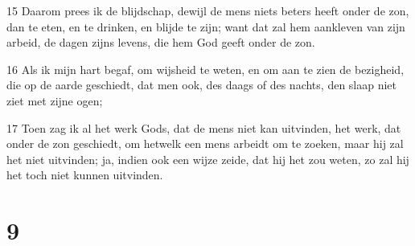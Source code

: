 \par 15 Daarom prees ik de blijdschap, dewijl de mens niets beters heeft onder de zon, dan te eten, en te drinken, en blijde te zijn; want dat zal hem aankleven van zijn arbeid, de dagen zijns levens, die hem God geeft onder de zon.
\par 16 Als ik mijn hart begaf, om wijsheid te weten, en om aan te zien de bezigheid, die op de aarde geschiedt, dat men ook, des daags of des nachts, den slaap niet ziet met zijne ogen;
\par 17 Toen zag ik al het werk Gods, dat de mens niet kan uitvinden, het werk, dat onder de zon geschiedt, om hetwelk een mens arbeidt om te zoeken, maar hij zal het niet uitvinden; ja, indien ook een wijze zeide, dat hij het zou weten, zo zal hij het toch niet kunnen uitvinden.

\chapter{9}

